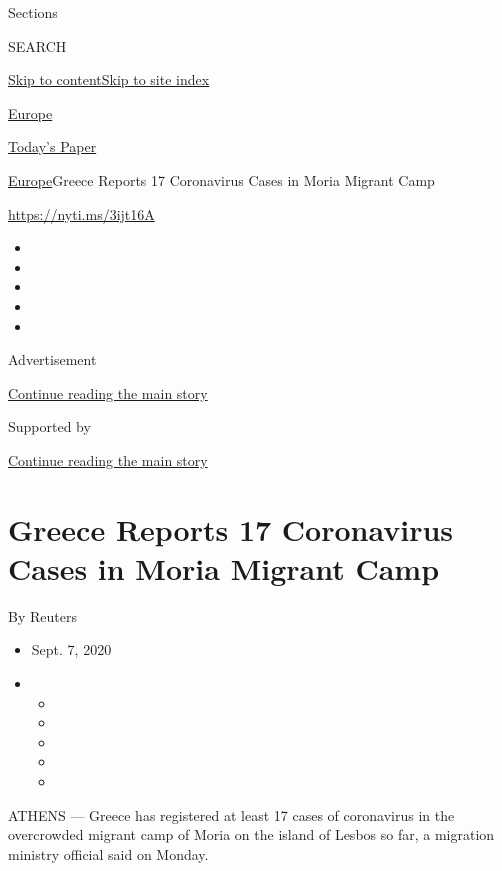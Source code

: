 Sections

SEARCH

\protect\hyperlink{site-content}{Skip to
content}\protect\hyperlink{site-index}{Skip to site index}

\href{https://www.nytimes3xbfgragh.onion/section/world/europe}{Europe}

\href{https://myaccount.nytimes3xbfgragh.onion/auth/login?response_type=cookie\&client_id=vi}{}

\href{https://www.nytimes3xbfgragh.onion/section/todayspaper}{Today's
Paper}

\href{/section/world/europe}{Europe}\textbar{}Greece Reports 17
Coronavirus Cases in Moria Migrant Camp

\url{https://nyti.ms/3ijt16A}

\begin{itemize}
\item
\item
\item
\item
\item
\end{itemize}

Advertisement

\protect\hyperlink{after-top}{Continue reading the main story}

Supported by

\protect\hyperlink{after-sponsor}{Continue reading the main story}

\hypertarget{greece-reports-17-coronavirus-cases-in-moria-migrant-camp}{%
\section{Greece Reports 17 Coronavirus Cases in Moria Migrant
Camp}\label{greece-reports-17-coronavirus-cases-in-moria-migrant-camp}}

By Reuters

\begin{itemize}
\item
  Sept. 7, 2020
\item
  \begin{itemize}
  \item
  \item
  \item
  \item
  \item
  \end{itemize}
\end{itemize}

ATHENS --- Greece has registered at least 17 cases of coronavirus in the
overcrowded migrant camp of Moria on the island of Lesbos so far, a
migration ministry official said on Monday.

